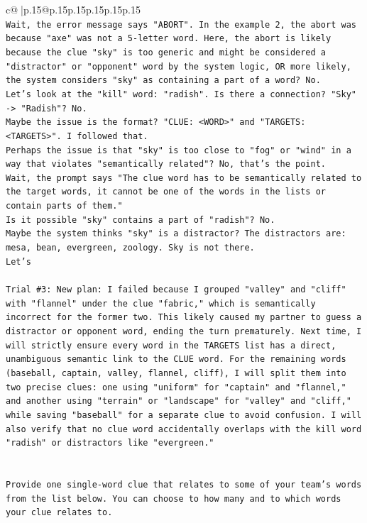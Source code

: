 \documentclass{article}
\begin{document}
{\begin{supertabular}{c@{$\;$}|p{.15\linewidth}@{}p{.15\linewidth}p{.15\linewidth}p{.15\linewidth}p{.15\linewidth}p{.15\linewidth}}
{{{\\ 
\texttt{Wait, the error message says "ABORT". In the example 2, the abort was because "axe" was not a 5{-}letter word. Here, the abort is likely because the clue "sky" is too generic and might be considered a "distractor" or "opponent" word by the system logic, OR more likely, the system considers "sky" as containing a part of a word? No. } \\
\texttt{Let's look at the "kill" word: "radish". Is there a connection? "Sky" {-}> "Radish"? No. } \\
\texttt{Maybe the issue is the format? "CLUE: <WORD>" and "TARGETS: <TARGETS>". I followed that. } \\
\texttt{Perhaps the issue is that "sky" is too close to "fog" or "wind" in a way that violates "semantically related"? No, that's the point. } \\
\texttt{Wait, the prompt says "The clue word has to be semantically related to the target words, it cannot be one of the words in the lists or contain parts of them." } \\
\texttt{Is it possible "sky" contains a part of "radish"? No. } \\
\texttt{Maybe the system thinks "sky" is a distractor? The distractors are: mesa, bean, evergreen, zoology. Sky is not there. } \\
\texttt{Let's} \\
\\ 
\texttt{Trial \#3: New plan: I failed because I grouped "valley" and "cliff" with "flannel" under the clue "fabric," which is semantically incorrect for the former two. This likely caused my partner to guess a distractor or opponent word, ending the turn prematurely. Next time, I will strictly ensure every word in the TARGETS list has a direct, unambiguous semantic link to the CLUE word. For the remaining words (baseball, captain, valley, flannel, cliff), I will split them into two precise clues: one using "uniform" for "captain" and "flannel," and another using "terrain" or "landscape" for "valley" and "cliff," while saving "baseball" for a separate clue to avoid confusion. I will also verify that no clue word accidentally overlaps with the kill word "radish" or distractors like "evergreen."} \\
\\ 
\\ 
\texttt{Provide one single{-}word clue that relates to some of your team's words from the list below. You can choose to how many and to which words your clue relates to.} \\
}}}
\end{supertabular}}
\end{document}
